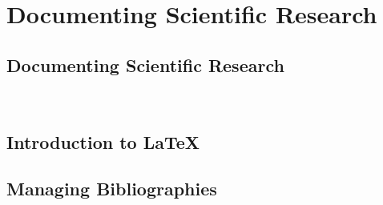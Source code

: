 \part{Documenting Scientific Research}
\label{p:writing}


\chapter{Documenting Scientific Research}
\label{C:doc}

\FILENAME\






% 

\chapter{Introduction to \LaTeX}
\label{C:latex}



\chapter{Managing Bibliographies}
\label{C:bibtex}



%

